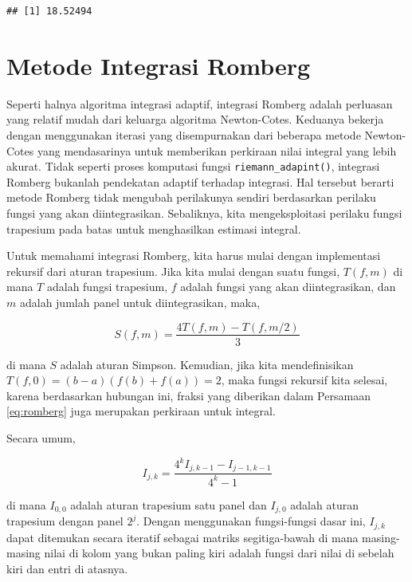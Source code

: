 \documentclass[]{book}
\theoremstyle{definition}
\theoremstyle{definition}
\theoremstyle{definition}
\theoremstyle{remark}
\begin{document}
\begin{verbatim}
## [1] 18.52494
\end{verbatim}

\hypertarget{romberg}{%
\section{Metode Integrasi Romberg}\label{romberg}}

Seperti halnya algoritma integrasi adaptif, integrasi Romberg adalah perluasan yang relatif mudah dari keluarga algoritma Newton-Cotes. Keduanya bekerja dengan menggunakan iterasi yang disempurnakan dari beberapa metode Newton-Cotes yang mendasarinya untuk memberikan perkiraan nilai integral yang lebih akurat. Tidak seperti proses komputasi fungsi \texttt{riemann\_adapint()}, integrasi Romberg bukanlah pendekatan adaptif terhadap integrasi. Hal tersebut berarti metode Romberg tidak mengubah perilakunya sendiri berdasarkan perilaku fungsi yang akan diintegrasikan. Sebaliknya, kita mengeksploitasi perilaku fungsi trapesium pada batas untuk menghasilkan estimasi integral.

Untuk memahami integrasi Romberg, kita harus mulai dengan implementasi rekursif dari aturan trapesium. Jika kita mulai dengan suatu fungsi, \(T\left(f, m\right)\) di mana \(T\) adalah fungsi trapesium, \(f\) adalah fungsi yang akan diintegrasikan, dan \(m\) adalah jumlah panel untuk diintegrasikan, maka,

\begin{equation}
S\left(f, m\right)=\frac{4T\left(f, m\right)-T\left(f, m/2\right)}{3}
  \label{eq:romberg}
\end{equation}

di mana \(S\) adalah aturan Simpson. Kemudian, jika kita mendefinisikan \(T \left(f, 0\right) = \left(b − a\right) \left(f \left(b\right) + f \left(a\right)\right) = 2\), maka fungsi rekursif kita selesai, karena berdasarkan hubungan ini, fraksi yang diberikan dalam Persamaan \eqref{eq:romberg} juga merupakan perkiraan untuk integral.

Secara umum,

\begin{equation}
I_{j,k}=\frac{4^k I_{j,k-1}-I_{j-1,k-1}}{4^k-1}
  \label{eq:romberg2}
\end{equation}

di mana \(I_{0, 0}\) adalah aturan trapesium satu panel dan \(I_{j, 0}\) adalah aturan trapesium dengan panel \(2^j\). Dengan menggunakan fungsi-fungsi dasar ini, \(I_{j, k}\) dapat ditemukan secara iteratif sebagai matriks segitiga-bawah di mana masing-masing nilai di kolom yang bukan paling kiri adalah fungsi dari nilai di sebelah kiri dan entri di atasnya.
\end{document}
